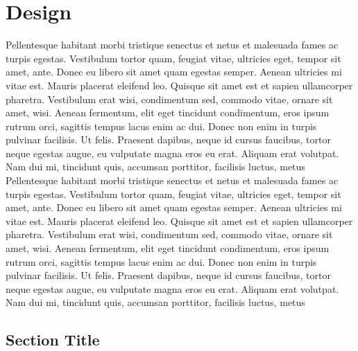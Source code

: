 
\chapter{Design}\label{sec:design}
Pellentesque habitant morbi tristique senectus et netus et malesuada fames ac turpis egestas. Vestibulum tortor quam, feugiat vitae, ultricies eget, tempor sit amet, ante. Donec eu libero sit amet quam egestas semper. Aenean ultricies mi vitae est. Mauris placerat eleifend leo. Quisque sit amet est et sapien ullamcorper pharetra. Vestibulum erat wisi, condimentum sed, commodo vitae, ornare sit amet, wisi. Aenean fermentum, elit eget tincidunt condimentum, eros ipsum rutrum orci, sagittis tempus lacus enim ac dui. Donec non enim in turpis pulvinar facilisis. Ut felis. Praesent dapibus, neque id cursus faucibus, tortor neque egestas augue, eu vulputate magna eros eu erat. Aliquam erat volutpat. Nam dui mi, tincidunt quis, accumsan porttitor, facilisis luctus, metus
Pellentesque habitant morbi tristique senectus et netus et malesuada fames ac turpis egestas. Vestibulum tortor quam, feugiat vitae, ultricies eget, tempor sit amet, ante. Donec eu libero sit amet quam egestas semper. Aenean ultricies mi vitae est. Mauris placerat eleifend leo. Quisque sit amet est et sapien ullamcorper pharetra. Vestibulum erat wisi, condimentum sed, commodo vitae, ornare sit amet, wisi. Aenean fermentum, elit eget tincidunt condimentum, eros ipsum rutrum orci, sagittis tempus lacus enim ac dui. Donec non enim in turpis pulvinar facilisis. Ut felis. Praesent dapibus, neque id cursus faucibus, tortor neque egestas augue, eu vulputate magna eros eu erat. Aliquam erat volutpat. Nam dui mi, tincidunt quis, accumsan porttitor, facilisis luctus, metus

\section{Section Title}

